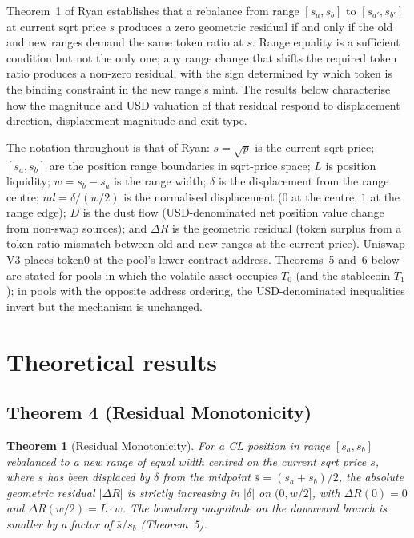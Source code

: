 \documentclass[11pt,a4paper]{article}
\newtheorem{theorem}{Theorem}
\theoremstyle{definition}
\begin{document}
Theorem~1 of Ryan\cite{ryan2026a} establishes that a rebalance from range $[s_a, s_b]$ to $[s_{a'}, s_{b'}]$ at current sqrt price $s$ produces a zero geometric residual if and only if the old and new ranges demand the same token ratio at $s$. Range equality is a sufficient condition but not the only one; any range change that shifts the required token ratio produces a non-zero residual, with the sign determined by which token is the binding constraint in the new range's mint. The results below characterise how the magnitude and USD valuation of that residual respond to displacement direction, displacement magnitude and exit type.

The notation throughout is that of Ryan\cite{ryan2026a}: $s = \sqrt{p}$ is the current sqrt price; $[s_a, s_b]$ are the position range boundaries in sqrt-price space; $L$ is position liquidity; $w = s_b - s_a$ is the range width; $\delta$ is the displacement from the range centre; $nd = \delta/(w/2)$ is the normalised displacement ($0$ at the centre, $1$ at the range edge); $D$ is the dust flow (USD-denominated net position value change from non-swap sources); and $\Delta R$ is the geometric residual (token surplus from a token ratio mismatch between old and new ranges at the current price). Uniswap V3 places token0 at the pool's lower contract address. Theorems~5 and~6 below are stated for pools in which the volatile asset occupies $T_0$ (and the stablecoin $T_1$); in pools with the opposite address ordering, the USD-denominated inequalities invert but the mechanism is unchanged.

\section{Theoretical results}

\subsection{Theorem 4 (Residual Monotonicity)}

\begin{theorem}[Residual Monotonicity]
For a CL position in range $[s_a, s_b]$ rebalanced to a new range of equal width centred on the current sqrt price $s$, where $s$ has been displaced by $\delta$ from the midpoint $\bar{s} = (s_a + s_b)/2$, the absolute geometric residual $|\Delta R|$ is strictly increasing in $|\delta|$ on $(0, w/2]$, with $\Delta R(0) = 0$ and $\Delta R(w/2) = L \cdot w$. The boundary magnitude on the downward branch is smaller by a factor of $\bar{s}/s_b$ (Theorem~5).
\end{theorem}
\end{document}
